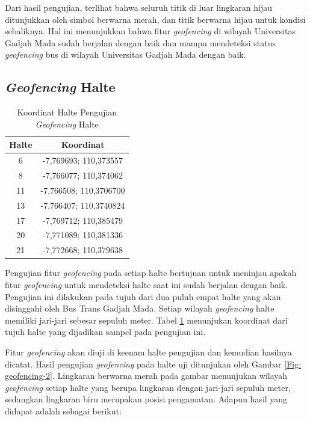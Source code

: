 Dari hasil pengujian, terlihat bahwa seluruh titik di luar lingkaran hijau ditunjukkan oleh simbol berwarna merah, dan titik berwarna hijau untuk kondisi sebaliknya. Hal ini menunjukkan bahwa fitur \textit{geofencing} di wilayah Universitas Gadjah Mada sudah berjalan dengan baik dan mampu mendeteksi status \textit{geofencing} bus di wilayah Universitas Gadjah Mada dengan baik.

\subsection{\textit{Geofencing} Halte}
\begin{table}[H]
	\caption{Koordinat Halte Pengujian \textit{Geofencing} Halte}
	\vspace{0.5em}
	\centering
	\begin{tabular}{cc}
		\hline
		\textbf{Halte} &\textbf{Koordinat} \\
		\hline
		6 & -7,769693; 110,373557 \\
		8 &-7,766077; 110,374062\\ 
		11 &-7,766508; 110,3706700\\
		13 & -7,766407; 110,3740824\\
		17 &-7,769712; 110,385479\\ 
		20 & -7,771089; 110,381336\\
		21 & -7,772668; 110,379638\\
		\hline
	\end{tabular}
	\label{Tab: geofencing-2}
\end{table}

Pengujian fitur \textit{geofencing} pada setiap halte bertujuan untuk meninjau apakah fitur \textit{geofencing} untuk mendeteksi halte saat ini sudah berjalan dengan baik. Pengujian ini dilakukan pada tujuh dari dua puluh empat halte yang akan disinggahi oleh Bus Trans Gadjah Mada. Setiap wilayah \textit{geofencing} halte memiliki jari-jari sebesar sepuluh meter. Tabel \ref{Tab: geofencing-2} menunjukan koordinat dari tujuh halte yang dijadikan sampel pada pengujian ini.

Fitur \textit{geofencing} akan diuji di keenam halte pengujian dan kemudian hasilnya dicatat. Hasil pengujian \textit{geofencing} pada halte uji ditunjukan oleh Gambar \ref{Fig: geofencing-2}. Lingkaran berwarna merah pada gambar menunjukan wilayah \textit{geofencing} setiap halte yang berupa lingkaran dengan jari-jari sepuluh meter, sedangkan lingkaran biru merupakan posisi pengamatan. Adapun hasil yang didapat adalah sebagai berikut:

